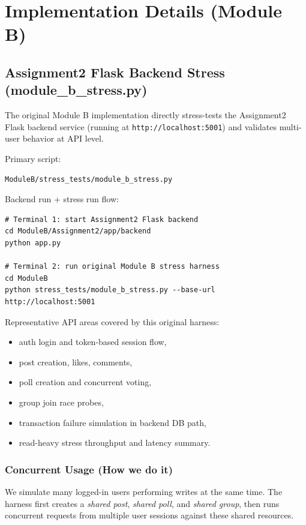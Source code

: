 \documentclass[12pt,a4paper]{article}
\begin{document}
\section{Implementation Details (Module B)}

\subsection{Assignment2 Flask Backend Stress (module\_b\_stress.py)}
The original Module B implementation directly stress-tests the Assignment2 Flask backend service (running at \texttt{http://localhost:5001}) and validates multi-user behavior at API level.

Primary script:
\begin{lstlisting}[basicstyle=\ttfamily\small]
ModuleB/stress_tests/module_b_stress.py
\end{lstlisting}

Backend run + stress run flow:
\begin{lstlisting}[basicstyle=\ttfamily\small, caption={Original Module B backend stress execution flow}]
# Terminal 1: start Assignment2 Flask backend
cd ModuleB/Assignment2/app/backend
python app.py

# Terminal 2: run original Module B stress harness
cd ModuleB
python stress_tests/module_b_stress.py --base-url http://localhost:5001
\end{lstlisting}

Representative API areas covered by this original harness:
\begin{itemize}[noitemsep]
  \item auth login and token-based session flow,
  \item post creation, likes, comments,
  \item poll creation and concurrent voting,
  \item group join race probes,
  \item transaction failure simulation in backend DB path,
  \item read-heavy stress throughput and latency summary.
\end{itemize}

\subsubsection{Concurrent Usage (How we do it)}
We simulate many logged-in users performing writes at the same time. The harness first creates a \emph{shared post}, \emph{shared poll}, and \emph{shared group}, then runs concurrent requests from multiple user sessions against these shared resources.
\end{document}
